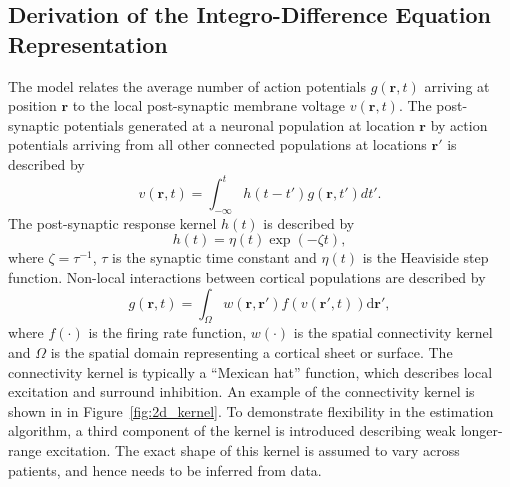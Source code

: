 \documentclass[10pt]{article}
\begin{document}
\subsection{Derivation of the Integro-Difference Equation Representation}
The model relates the average number of action potentials $g(\mathbf{r},t)$ arriving at position $\mathbf{r}$ to the local post-synaptic membrane voltage $v(\mathbf{r},t)$. The post-synaptic potentials generated at a neuronal population at location $\mathbf{r}$ by action potentials arriving from all other connected populations at locations $\mathbf{r}'$ is described by 
\begin{equation}
	\label{SpikesToPotential} v\left( {\mathbf{r},t} \right) = \int_{ - \infty }^t {h\left( {t - t'} \right)g\left( {\mathbf{r},t'} \right)dt'}. 
\end{equation}
The post-synaptic response kernel $h(t)$ is described by 
\begin{equation}
	\label{SynapticRespKernel} h(t) = \eta(t)\exp{\left(-\zeta t\right)}, 
\end{equation}
where $\zeta=\tau^{-1}$, $\tau$ is the synaptic time constant and $\eta(t)$ is the Heaviside step function. Non-local interactions between cortical populations are described by 
\begin{equation}
	\label{RateBasedInteractions} g\left( \mathbf{r},t \right) = \int_\Omega {w\left( \mathbf{r},\mathbf{r}' \right)f\left( v\left( \mathbf{r}',t \right) \right)\textrm{d}\mathbf{r}'}, 
\end{equation}
where $f(\cdot)$ is the firing rate function, $w(\cdot)$ is the spatial connectivity kernel and $\Omega$ is the spatial domain representing a cortical sheet or surface. The connectivity kernel is typically a ``Mexican hat'' function, which describes local excitation and surround inhibition. An example of the connectivity kernel is shown in in Figure~\ref{fig:2d_kernel}. To demonstrate flexibility in the estimation algorithm, a third component of the kernel is introduced describing weak longer-range excitation. The exact shape of this kernel is assumed to vary across patients, and hence needs to be inferred from data.
\end{document}
